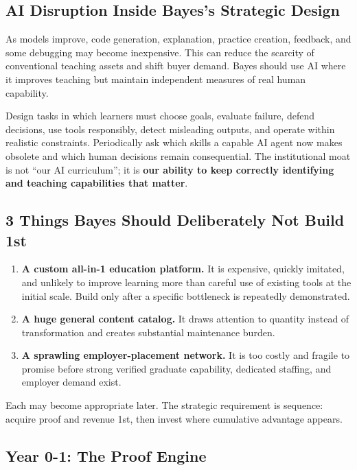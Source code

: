 \subsection{AI Disruption Inside Bayes's Strategic Design}
\label{sec:ai_disruption_inside_strategic_design}

As models improve, code generation, explanation, practice creation, feedback, and some debugging may become inexpensive. This can reduce the scarcity of conventional teaching assets and shift buyer demand. Bayes should use AI where it improves teaching but maintain independent measures of real human capability.

Design tasks in which learners must choose goals, evaluate failure, defend decisions, use tools responsibly, detect misleading outputs, and operate within realistic constraints. Periodically ask which skills a capable AI agent now makes obsolete and which human decisions remain consequential. The institutional moat is not ``our AI curriculum''; it is \textbf{our ability to keep correctly identifying and teaching capabilities that matter}.

\subsection{3 Things Bayes Should Deliberately Not Build 1st}
\label{sec:three_things_not_to_build_first}

\begin{enumerate}
    \item \textbf{A custom all-in-1 education platform.} It is expensive, quickly imitated, and unlikely to improve learning more than careful use of existing tools at the initial scale. Build only after a specific bottleneck is repeatedly demonstrated.
    \item \textbf{A huge general content catalog.} It draws attention to quantity instead of transformation and creates substantial maintenance burden.
    \item \textbf{A sprawling employer-placement network.} It is too costly and fragile to promise before strong verified graduate capability, dedicated staffing, and employer demand exist.
\end{enumerate}

Each may become appropriate later. The strategic requirement is sequence: acquire proof and revenue 1st, then invest where cumulative advantage appears.

\subsection{Year 0-1: The Proof Engine}
\label{sec:year_0_1_proof_engine}

